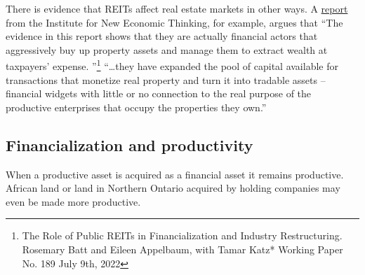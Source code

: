 There is evidence that REITs affect real estate markets in other ways. A \href{https://www.ineteconomics.org/research/research-papers/the-role-of-public-reits-in-financialization-and-industry-restructuring}{report} from the Institute for New Economic Thinking, for example, argues that ``The evidence in this report shows that they are actually financial actors that aggressively buy up property assets and manage them to extract wealth at taxpayers’ expense. ''\footnote{The Role of Public REITs in Financialization and Industry Restructuring. Rosemary Batt and Eileen Appelbaum, with Tamar Katz* Working Paper No. 189 July 9th, 2022} ``\dots they have expanded the pool of capital available for transactions that monetize real property and turn it into tradable assets – financial widgets with little or no connection to the real purpose of the productive enterprises that occupy the properties they own.''

\subsection{Financialization and productivity}

When  a productive asset is acquired as a financial asset it remains productive. African land or land in Northern Ontario acquired by holding companies may even be made more productive. 


